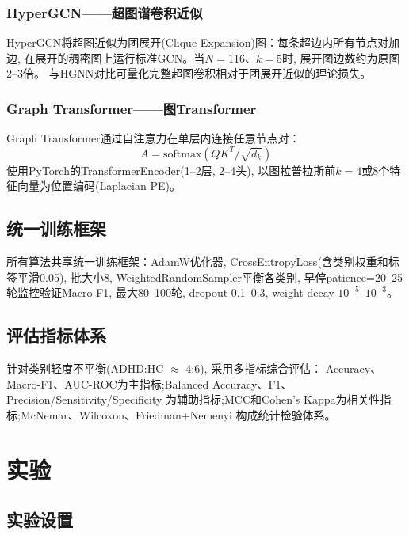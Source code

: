 \documentclass[12pt,a4paper,heading=true,fontset=windows]{ctexart}
\begin{document}
\subsubsection{HyperGCN——超图谱卷积近似}

HyperGCN\cite{yadati2019hypergcn}将超图近似为团展开(Clique Expansion)图：每条超边内所有节点对加边,
在展开的稠密图上运行标准GCN。当$N=116$、$k=5$时, 展开图边数约为原图2--3倍。
与HGNN对比可量化完整超图卷积相对于团展开近似的理论损失。

\subsubsection{Graph Transformer——图Transformer}

Graph Transformer\cite{dwivedi2021graph}通过自注意力在单层内连接任意节点对：
\begin{equation}
    A = \text{softmax}\left(QK^T / \sqrt{d_k}\right)
\end{equation}
使用PyTorch的TransformerEncoder(1--2层, 2--4头),
以图拉普拉斯前$k=4$或8个特征向量为位置编码(Laplacian PE)。

\subsection{统一训练框架}

所有算法共享统一训练框架：AdamW优化器, CrossEntropyLoss(含类别权重和标签平滑0.05),
批大小8, WeightedRandomSampler平衡各类别, 早停patience=20--25轮监控验证Macro-F1,
最大80--100轮, dropout 0.1--0.3, weight decay $10^{-5}$--$10^{-3}$。

\subsection{评估指标体系}

针对类别轻度不平衡(ADHD:HC $\approx$ 4:6), 采用多指标综合评估：
Accuracy、Macro-F1、AUC-ROC为主指标;Balanced Accuracy、F1、Precision/Sensitivity/Specificity
为辅助指标;MCC和Cohen's Kappa为相关性指标;McNemar、Wilcoxon、Friedman+Nemenyi
构成统计检验体系。

\section{实验}

\subsection{实验设置}
\end{document}
